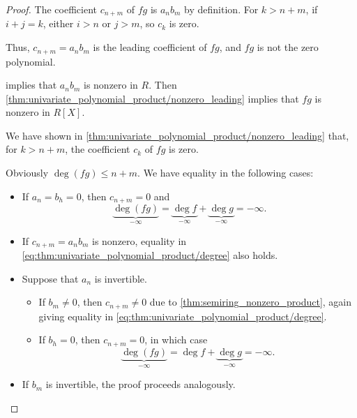 \begin{proof}
   The coefficient \( c_{n+m} \) of \( f g \) is \( a_n b_m \) by definition. For \( k > n + m \), if \( i + j = k \), either \( i > n \) or \( j > m \), so \( c_k \) is zero.

  Thus, \( c_{n+m} = a_n b_m \) is the leading coefficient of \( fg \), and \( fg \) is not the zero polynomial.

    implies that \( a_n b_m \) is nonzero in \( R \). Then \cref{thm:univariate_polynomial_product/nonzero_leading} implies that \( fg \) is nonzero in \( R[X] \).

   We have shown in \cref{thm:univariate_polynomial_product/nonzero_leading} that, for \( k > n + m \), the coefficient \( c_k \) of \( fg \) is zero.

  Obviously \( \deg(fg) \leq n + m \). We have equality in the following cases:
  \begin{itemize}
    \item If \( a_n = b_h = 0 \), then \( c_{n+m} = 0 \) and
    \begin{equation*}
      \underbrace{\deg(fg)}_{-\infty} = \underbrace{\deg f}_{-\infty} + \underbrace{\deg g}_{-\infty} = -\infty.
    \end{equation*}

    \item If \( c_{n+m} = a_n b_m \) is nonzero, equality in \eqref{eq:thm:univariate_polynomial_product/degree} also holds.

    \item Suppose that \( a_n \) is invertible.
    \begin{itemize}
      \item If \( b_m \neq 0 \), then \( c_{n+m} \neq 0 \) due to \cref{thm:semiring_nonzero_product}, again giving equality in \eqref{eq:thm:univariate_polynomial_product/degree}.

      \item If \( b_h = 0 \), then \( c_{n+m} = 0 \), in which case
      \begin{equation*}
        \underbrace{\deg(fg)}_{-\infty} = \deg f + \underbrace{\deg g}_{-\infty} = -\infty.
      \end{equation*}
    \end{itemize}

    \item If \( b_m \) is invertible, the proof proceeds analogously.
  \end{itemize}
\end{proof}

